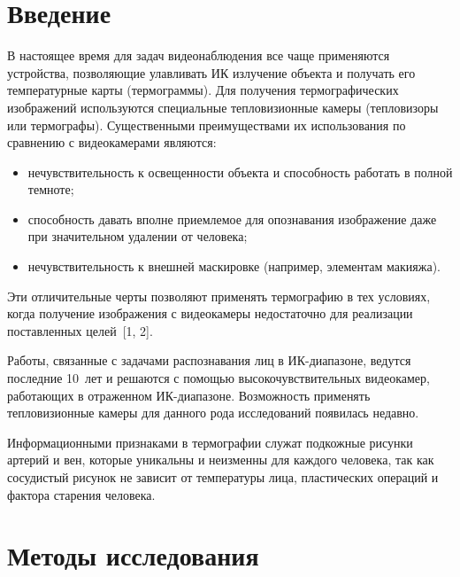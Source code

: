      \begin{multicols}{2}
      
            \label{st\stat}
            


\section{Введение}
  
  В настоящее время для задач видеонаблюдения все чаще применяются 
устройства, позволяющие улавливать ИК излучение объекта и получать 
его температурные карты (термограммы). Для получения термографических 
изображений используются специальные тепловизионные камеры (тепловизоры 
или термографы). Существенными преимуществами их использования по 
сравнению с видеокамерами являются:
  \begin{itemize}
\item нечувствительность к освещенности объекта и способность работать в 
полной темноте;
\item способность давать вполне приемлемое для опознавания изображение даже 
при значительном удалении от человека;
\item нечувствительность к внешней маскировке (например, элементам макияжа).
\end{itemize}

  Эти отличительные черты позволяют применять термографию в тех условиях, 
когда получение изображения с видеокамеры недостаточно для реализации 
поставленных целей~[1, 2].
  
  Работы, связанные с задачами распознавания лиц в  
  ИК-диа\-па\-зо\-не, ведутся последние 10~лет и решаются с помощью 
высокочувствительных видеокамер, работающих в отра\-жен\-ном ИК-диа\-па\-зо\-не. 
Возможность применять тепловизионные камеры для данного рода исследований 
появилась недавно. 
  
  Информационными признаками в термографии служат подкожные рисунки 
артерий и вен, которые уникальны и неизменны для каждого человека, так как 
сосудистый рисунок не зависит от температуры лица, пластических операций и 
фактора старения человека.

\vspace*{-6pt}

\section{Методы исследования}

\vspace*{-2pt}


\end{multicols}
